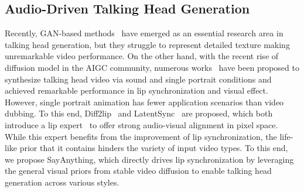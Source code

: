 \subsection{Audio-Driven Talking Head Generation}
Recently, GAN-based methods~\cite{prajwal2020lip, zhang2023dinet, zhong2023identity, wang2023lipformer, tan2024style2talker, tan2025edtalk, yang2024ladtalk, zhang2024musetalk, cheng2022videoretalking} have emerged as an essential research area in talking head generation, but they struggle to represent detailed texture making unremarkable video performance. On the other hand, with the recent rise of diffusion model in the AIGC community, numerous works~\cite{xu2024hallo, xu2024vasa, tian2025emo, chen2024echomimic, zhu2024infp} have been proposed to synthesize talking head video via sound and single portrait conditions and achieved remarkable performance in lip synchronization and visual effect. However, single portrait animation has fewer application scenarios than video dubbing. To this end, Diff2lip~\cite{mukhopadhyay2024diff2lip}  and LatentSync~\cite{li2024latentsync} are proposed, which both introduce a lip expert~\cite{prajwal2020lip} to offer strong audio-visual alignment in pixel space. While this expert benefits from the improvement of lip synchronization, the life-like prior that it contains hinders the variety of input video types. To this end, we propose SayAnything, which directly drives lip synchronization by leveraging the general visual priors from stable video diffusion to enable talking head generation across various styles.
